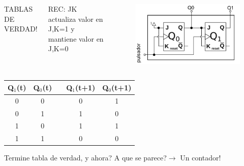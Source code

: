\documentclass[10pt]{beamer}
\begin{document}
\begin{frame}
{\begin{columns}
\begin{mdframed}[backgroundcolor=frenchblue!20]
  TABLAS DE VERDAD!
\end{mdframed}
\vspace{0.15cm}
REC: JK actualiza valor en J,K=1 y mantiene valor en J,K=0
\begin{figure}[h!]
    \centering
    \includegraphics[scale=0.23]{circuito.png}
\end{figure}
\end{columns}
\begin{table}[h!]
\begin{tabular}{|c|c|c|c|c|}
\hline
Q$_1$(t) & Q$_0$(t) &  & Q$_1$(t+1) & Q$_0$(t+1) \\ \hline
0        & 0        &  & 0          & 1          \\ \hline
0        & 1        &  & 1          & 0          \\ \hline
1        & 0        &  & 1          & 1          \\ \hline
1        & 1        &  & 0          & 0          \\ \hline
\end{tabular}
\end{table}
Termine tabla de verdad, y ahora? A que se parece?$\to$ Un
contador!}




\end{frame}
\end{document}

